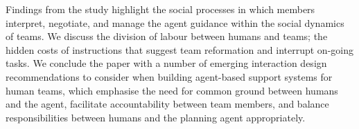 Findings from the study highlight the social processes in which members interpret, negotiate, and manage the agent guidance within the social dynamics of teams. We discuss the division of labour between humans and teams; the hidden costs of instructions that suggest team reformation and interrupt on-going tasks. We conclude the paper with a number of emerging interaction design recommendations to consider when building agent-based support systems for human teams, which emphasise the need for common ground between humans and the agent, facilitate accountability between team members, and balance responsibilities between humans and the planning agent appropriately.\\




